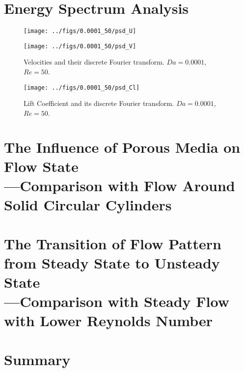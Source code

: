 \section{Energy Spectrum Analysis} %
\begin{figure}[]
	\centering
	\begin{minipage}{\textwidth}
		\centering
		\texttt{[image: ../figs/0.0001\_50/psd\_U]}
	\end{minipage}
	\centering
	\begin{minipage}{\textwidth}
		\centering
		\texttt{[image: ../figs/0.0001\_50/psd\_V]}
	\end{minipage}
	\caption{Velocities and their discrete Fourier transform. $Da=0.0001$, $Re=50$.}
\end{figure}

\begin{figure}
	\centering
	\texttt{[image: ../figs/0.0001\_50/psd\_Cl]}
	\caption{Lift Coefficient and its discrete Fourier transform. $Da=0.0001$, $Re=50$.}
\end{figure}


\section{The Influence of Porous Media on Flow State\\
	---Comparison with Flow Around Solid Circular Cylinders}


\section{The Transition of Flow Pattern from Steady State to Unsteady State\\
	---Comparison with Steady Flow with Lower Reynolds Number}


\section{Summary}
